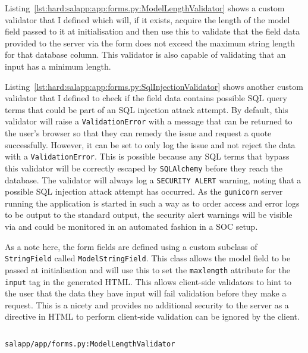 Listing~\ref{lst:hard:salapp:app:forms.py:ModelLengthValidator} shows a custom validator that I defined which will, if it exists, acquire the length of the model field passed to it at initialisation and then use this to validate that the field data provided to the server via the form does not exceed the maximum string length for that database column. This validator is also capable of validating that an input has a minimum length.

Listing~\ref{lst:hard:salapp:app:forms.py:SqlInjectionValidator} shows another custom validator that I defined to check if the field data contains possible SQL query terms that could be part of an SQL injection attack attempt. By default, this validator will raise a \texttt{ValidationError} with a message that can be returned to the user's browser so that they can remedy the issue and request a quote successfully. However, it can be set to only log the issue and not reject the data with a \texttt{ValidationError}. This is possible because any SQL terms that bypass this validator will be correctly escaped by \texttt{SQLAlchemy} before they reach the database. The validator will always log a \texttt{SECURITY ALERT} warning, noting that a possible SQL injection attack attempt has occurred. As the \texttt{gunicorn} server running the application is started in such a way as to order access and error logs to be output to the standard output, the security alert warnings will be visible via  and could be monitored in an automated fashion in a SOC setup.

As a note here, the form fields are defined using a custom subclass of \texttt{StringField} called \texttt{ModelStringField}. This class allows the model field to be passed at initialisation and will use this to set the \texttt{maxlength} attribute for the \texttt{input} tag in the generated HTML. This allows client-side validators to hint to the user that the data they have input will fail validation before they make a request. This is a nicety and provides no additional security to the server as a directive in HTML to perform client-side validation can be ignored by the client.

\begin{listing}[H]
  \captionsetup{skip=\skiplistingcaptionlen}
  \inputminted[breakanywhere,firstline=13,lastline=31]{python3}{../uswacs-2-iy2d502-salapp/app/forms.py}
  \caption{\texttt{salapp/app/forms.py:ModelLengthValidator}}
  \label{lst:hard:salapp:app:forms.py:ModelLengthValidator}
\end{listing}

